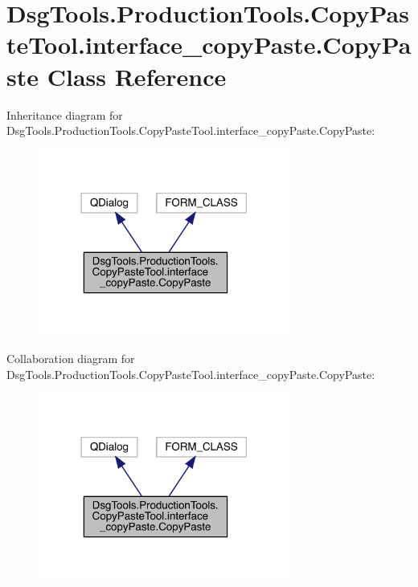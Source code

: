 \hypertarget{class_dsg_tools_1_1_production_tools_1_1_copy_paste_tool_1_1interface__copy_paste_1_1_copy_paste}{}\section{Dsg\+Tools.\+Production\+Tools.\+Copy\+Paste\+Tool.\+interface\+\_\+copy\+Paste.\+Copy\+Paste Class Reference}
\label{class_dsg_tools_1_1_production_tools_1_1_copy_paste_tool_1_1interface__copy_paste_1_1_copy_paste}


Inheritance diagram for Dsg\+Tools.\+Production\+Tools.\+Copy\+Paste\+Tool.\+interface\+\_\+copy\+Paste.\+Copy\+Paste\+:
\nopagebreak
\begin{figure}[H]
\begin{center}
\leavevmode
\includegraphics[width=234pt]{class_dsg_tools_1_1_production_tools_1_1_copy_paste_tool_1_1interface__copy_paste_1_1_copy_paste__inherit__graph}
\end{center}
\end{figure}


Collaboration diagram for Dsg\+Tools.\+Production\+Tools.\+Copy\+Paste\+Tool.\+interface\+\_\+copy\+Paste.\+Copy\+Paste\+:
\nopagebreak
\begin{figure}[H]
\begin{center}
\leavevmode
\includegraphics[width=234pt]{class_dsg_tools_1_1_production_tools_1_1_copy_paste_tool_1_1interface__copy_paste_1_1_copy_paste__coll__graph}
\end{center}
\end{figure}
